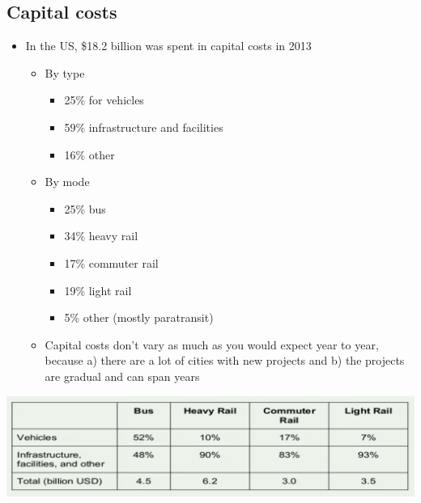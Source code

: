 \documentclass[11pt]{article}
\begin{document}
\subsection{Capital costs}
\label{sec:org62b2f78}
\begin{itemize}
\item In the US, \$18.2 billion was spent in capital costs in 2013
\begin{itemize}
\item By type
\begin{itemize}
\item 25\% for vehicles
\item 59\% infrastructure and facilities
\item 16\% other
\end{itemize}
\item By mode
\begin{itemize}
\item 25\% bus
\item 34\% heavy rail
\item 17\% commuter rail
\item 19\% light rail
\item 5\% other (mostly paratransit)
\end{itemize}
\item Capital costs don't vary as much as you would expect year to year, because a) there are a lot of cities with new projects and b) the projects are gradual and can span years
\end{itemize}
\end{itemize}

\begin{center}
\includegraphics[width=.9\linewidth]{.images/cap-cost-breakdown.png}
\end{center}
\end{document}

